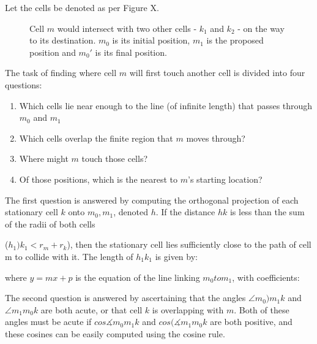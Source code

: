 \documentclass[12pt]{article}
\begin{document}
Let the cells be denoted as per Figure X.

\begin{figure}[H]
\centering
\caption{Cell \(m\) would intersect with two other 
  cells - \(k_1\) and \(k_2\) - on the way to its destination. 
  \(m_0\) is its initial position, \(m_1\) is the proposed position and 
\(m_0'\) is its final position.}
\end{figure}

The task of finding where cell \(m\) will first touch another 
cell is divided into four questions:

\begin{enumerate}
\item Which cells lie near enough to the line (of infinite length) that 
passes through \(m_0\) and \(m_1\)
\item Which cells overlap the finite region that \(m\) moves 
through?
\item Where might \(m\) touch those cells?
\item Of those positions, which is the nearest to \(m\)'s 
starting location?
\end{enumerate}

The first question is answered by computing the orthogonal projection of 
each stationary cell \(k\) onto \(m_0,m_1\), denoted 
\(h\). If the distance \(hk\) is less than the sum of the radii of both cells 

\newpage

(\(h_1)k_1 < r_m + r_k\)), then the 
stationary cell lies sufficiently close to the path of cell m to collide 
with it. The length of \(h_1k_1\) is given by:

\begin{figure}[H]
\centering
\end{figure}

where \(y = mx + p\) is the equation of the line linking \(m_0
 to m_1\), with coefficients:

\begin{figure}[H]
\centering
\end{figure}

The second question is answered by ascertaining that the angles \(\angle m_0
)m_1k\) and \(\angle m_1m_0k\) are both acute, or that 
cell \(k\) is overlapping with \(m\). Both of these angles 
must be acute if \(cos\measuredangle m_0m_1k\) and \(cos(\measuredangle m_1m_0k\) are 
both positive, and these cosines can be easily computed 
using the cosine rule.
\end{document}
